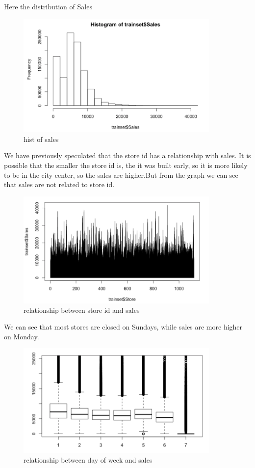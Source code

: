 \documentclass[12pt]{article}
\begin{document}
Here the distribution of Sales

\begin{figure}[h]
\centering
\includegraphics[width=10cm]{image/hist_sales.png}
\caption{hist of sales}
\label{fig3}
\end{figure}


We have previously speculated that the store id has a relationship with sales. It is possible that the smaller the store id is, the it was built early, so it is more likely to be in the city center, so the sales are higher.But from the graph we can see that sales are not related to store id.
\begin{figure}[h]
\centering
\includegraphics[width=10cm]{image/relationship_between_store_id_and_sales.png}
\caption{relationship between store id and sales}
\label{fig4}
\end{figure}




We can see that most stores are closed on Sundays, while sales are more higher on Monday.

\begin{figure}[h]
\centering
\includegraphics[width=10cm]{image/relationship_between_day_of_week_and_sales.png}
\caption{relationship between day of week and sales}
\label{fig5}

\end{figure}
\end{document}
